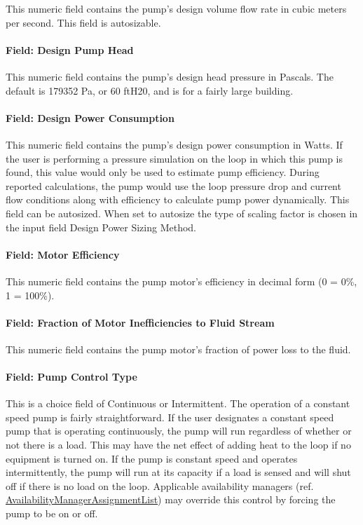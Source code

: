 This numeric field contains the pump's design volume flow rate in cubic meters per second. This field is autosizable.

\paragraph{Field: Design Pump Head}\label{field-design-pump-head-1}

This numeric field contains the pump's design head pressure in Pascals. The default is 179352 Pa, or 60 ftH20, and is for a fairly large building.

\paragraph{Field: Design Power Consumption}\label{field-design-power-consumption-1}

This numeric field contains the pump's design power consumption in Watts. If the user is performing a pressure simulation on the loop in which this pump is found, this value would only be used to estimate pump efficiency. During reported calculations, the pump would use the loop pressure drop and current flow conditions along with efficiency to calculate pump power dynamically. This field can be autosized. When set to autosize the type of scaling factor is chosen in the input field Design Power Sizing Method.

\paragraph{Field: Motor Efficiency}\label{field-motor-efficiency-1-000}

This numeric field contains the pump motor's efficiency in decimal form (0 = 0\%, 1 = 100\%).

\paragraph{Field: Fraction of Motor Inefficiencies to Fluid Stream}\label{field-fraction-of-motor-inefficiencies-to-fluid-stream-1}

This numeric field contains the pump motor's fraction of power loss to the fluid.

\paragraph{Field: Pump Control Type}\label{field-pump-control-type-1-000}

This is a choice field of Continuous or Intermittent. The operation of a constant speed pump is fairly straightforward. If the user designates a constant speed pump that is operating continuously, the pump will run regardless of whether or not there is a load. This may have the net effect of adding heat to the loop if no equipment is turned on. If the pump is constant speed and operates intermittently, the pump will run at its capacity if a load is sensed and will shut off if there is no load on the loop. Applicable availability managers (ref. \hyperref[availabilitymanagerassignmentlist]{AvailabilityManagerAssignmentList}) may override this control by forcing the pump to be on or off.

